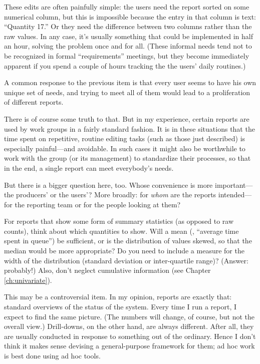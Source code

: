 These edits are often painfully simple: the users need the report
sorted on some numerical column, but this is impossible because the
entry in that column is text: ``Quantity 17.'' Or they need the
difference between two columns rather than the raw values.  In any
case, it's usually something that could be implemented in half an
hour, solving the problem once and for all. (These informal needs tend
not to be recognized in formal ``requirements'' meetings, but they
become immediately apparent if you spend a couple of hours tracking
the the users' daily routines.)

A common response to the previous item is that every user seems to
have his own unique set of needs, and trying to meet all of them would
lead to a proliferation of different reports.

There is of course some truth to that. But in my experience, certain
reports are used by work groups in a fairly standard fashion. It
is in these situations that the time spent on repetitive, routine editing
tasks\vadjust{\vfill\pagebreak} (such as those just described) is especially painful---and
avoidable.  In such cases it might also be worthwhile to work with the
group (or its management) to standardize their processes, so that in
the end, a single report can meet everybody's needs.

But there is a bigger question here, too. Whose convenience is more
important---the producers' or the users'? More broadly: for
\emph{whom} are the reports intended---for the reporting team or for
the people looking at them?

For reports that show some form of summary statistics (as opposed to
raw counts), think about which quantities to show. Will a mean (\eg,
``average time spent in queue'') be sufficient, or is the distribution
of values skewed, so that the median would be more appropriate?  Do
you need to include a measure for the width of the distribution
(standard deviation or inter-quartile range)? (Answer: probably!)
Also, don't neglect cumulative information (see Chapter
\ref{ch:univariate}).
 
This may be a controversial item. In my opinion, reports are exactly
that: standard overviews of the status of the system.  Every time I
run a report, I expect to find the same picture. (The numbers will
change, of course, but not the overall view.)  Drill-downs, on the
other hand, are always different.  After all, they are usually
conducted in response to something out of the ordinary.  Hence I don't
think it makes sense devising a general-purpose framework for them; ad
hoc work is best done using ad hoc tools.

